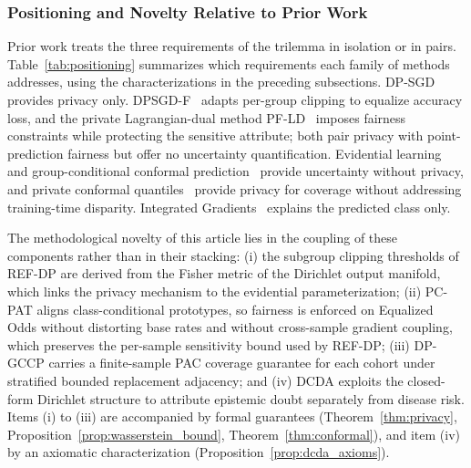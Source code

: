 \documentclass[pdflatex,sn-vancouver-num,referee,lineno]{sn-jnl}
\theoremstyle{thmstyleone}
\theoremstyle{thmstylethree}
\begin{document}
\subsubsection{Positioning and Novelty Relative to Prior Work}
\label{sec:novelty}
Prior work treats the three requirements of the trilemma in isolation or in pairs. Table~\ref{tab:positioning} summarizes which requirements each family of methods addresses, using the characterizations in the preceding subsections. DP-SGD~\cite{abadi2016deep} provides privacy only. DPSGD-F~\cite{xu2021removing} adapts per-group clipping to equalize accuracy loss, and the private Lagrangian-dual method PF-LD~\cite{tran2021differentially} imposes fairness constraints while protecting the sensitive attribute; both pair privacy with point-prediction fairness but offer no uncertainty quantification. Evidential learning~\cite{sensoy2018evidential} and group-conditional conformal prediction~\cite{vovk2003mondrian,romano2020malice} provide uncertainty without privacy, and private conformal quantiles~\cite{angelopoulos2021private} provide privacy for coverage without addressing training-time disparity. Integrated Gradients~\cite{sundararajan2017axiomatic} explains the predicted class only.

The methodological novelty of this article lies in the coupling of these components rather than in their stacking: (i) the subgroup clipping thresholds of REF-DP are derived from the Fisher metric of the Dirichlet output manifold, which links the privacy mechanism to the evidential parameterization; (ii) PC-PAT aligns class-conditional prototypes, so fairness is enforced on Equalized Odds without distorting base rates and without cross-sample gradient coupling, which preserves the per-sample sensitivity bound used by REF-DP; (iii) DP-GCCP carries a finite-sample PAC coverage guarantee for each cohort under stratified bounded replacement adjacency; and (iv) DCDA exploits the closed-form Dirichlet structure to attribute epistemic doubt separately from disease risk. Items (i) to (iii) are accompanied by formal guarantees (Theorem~\ref{thm:privacy}, Proposition~\ref{prop:wasserstein_bound}, Theorem~\ref{thm:conformal}), and item (iv) by an axiomatic characterization (Proposition~\ref{prop:dcda_axioms}).
\end{document}
